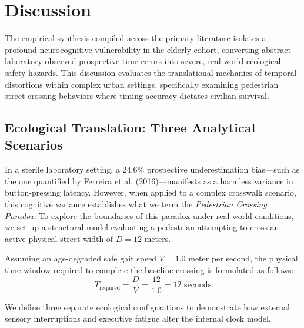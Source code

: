 \documentclass{custom_report}
\begin{document}
\newpage

\chapter{Discussion}
\label{ch:discussion}

The empirical synthesis compiled across the primary literature isolates a profound neurocognitive vulnerability in the elderly cohort, converting abstract laboratory-observed prospective time errors into severe, real-world ecological safety hazards. This discussion evaluates the translational mechanics of temporal distortions within complex urban settings, specifically examining pedestrian street-crossing behaviors where timing accuracy dictates civilian survival.

\section{Ecological Translation: Three Analytical Scenarios}
In a sterile laboratory setting, a 24.6\% prospective underestimation bias—such as the one quantified by Ferreira et al. (2016)—manifests as a harmless variance in button-pressing latency. However, when applied to a complex crosswalk scenario, this cognitive variance establishes what we term the \textit{Pedestrian Crossing Paradox}. To explore the boundaries of this paradox under real-world conditions, we set up a structural model evaluating a pedestrian attempting to cross an active physical street width of $D = 12$ meters. 

Assuming an age-degraded safe gait speed $V = 1.0$ meter per second, the physical time window required to complete the baseline crossing is formulated as follows:
\begin{equation}
    T_{\text{required}} = \frac{D}{V} = \frac{12}{1.0} = 12\text{ seconds}
\end{equation}

We define three separate ecological configurations to demonstrate how external sensory interruptions and executive fatigue alter the internal clock model.
\end{document}
